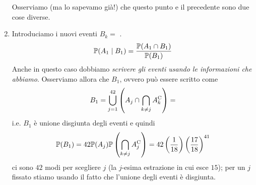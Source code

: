 \begin{enumerate}
	\begin{rem}
		Osserviamo (ma lo sapevamo già!) che questo punto e il precedente sono due cose diverse.
	\end{rem}
	\item Introduciamo i nuovi eventi $B_{k} =$ .
	\begin{equation*}
		\mathbb{P}(A_{1} \mid B_{1}) =\frac{\mathbb{P}(A_{1} \cap B_{1})}{\mathbb{P}(B_{1})}
	\end{equation*}
	Anche in questo caso dobbiamo \textit{scrivere gli eventi usando le informazioni che abbiamo}. Osserviamo allora che $B_{1}$, ovvero  può essere scritto come
	\begin{equation*}
		B_{1} =\bigcup_{j=1}^{42}\left(A_{j} \cap \bigcap_{k\neq j} A_{k}^{\mathrm{C}}\right) =
	\end{equation*}
	i.e. $B_{1}$ è unione disgiunta degli eventi  e quindi
	\begin{equation*}
		\mathbb{P}(B_{1}) =42\mathbb{P}(A_{j})\mathbb{P}\left(\bigcap_{k\neq j} A_{j}^{\mathrm{C}}\right) =42\left(\frac{1}{18}\right)\left(\frac{17}{18}\right)^{41}
	\end{equation*}
	ci sono $42$ modi per scegliere $j$ (la $j$-esima estrazione in cui esce $15$); per un $j$ fissato stiamo usando il fatto che l'unione degli eventi è disgiunta.


\end{enumerate}
